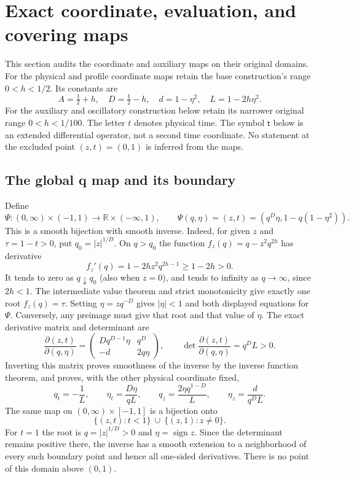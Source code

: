 \documentclass[10pt,a4paper]{article}
\begin{document}
\newtheorem{siproposition}{Proposition}[section]

\section{Exact coordinate, evaluation, and covering maps}
\label{si:maps-audit:coordinates}

This section audits the coordinate and auxiliary maps on their original
domains.  For the physical and profile coordinate maps retain the base
construction's range $0<h<1/2$.  Its constants are
\[
 A=\tfrac12+h,\quad D=\tfrac12-h,
 \quad d=1-\eta^2,\quad L=1-2h\eta^2.
\]
For the auxiliary and oscillatory construction below retain its narrower
original range $0<h<1/100$.
The letter $t$ denotes physical time.  The symbol $\mathsf t$ below is an
extended differential operator, not a second time coordinate.  No statement
at the excluded point $(z,t)=(0,1)$ is inferred from the maps.

\subsection{The global q map and its boundary}
Define
\[
 \Psi:(0,\infty)\times(-1,1)\longrightarrow
 \mathbb R\times(-\infty,1),\qquad
 \Psi(q,\eta)=(z,t)=(q^D\eta,1-q(1-\eta^2)).
\]
This is a smooth bijection with smooth inverse.  Indeed, for given $z$ and
$\tau=1-t>0$, put $q_0=|z|^{1/D}$.  On $q>q_0$ the function
$f_z(q)=q-z^2q^{2h}$ has derivative
\[
 f_z'(q)=1-2hz^2q^{2h-1}\ge1-2h>0.
\]
It tends to zero as $q\downarrow q_0$ (also when $z=0$), and tends to
infinity as $q\to\infty$, since $2h<1$.  The intermediate value theorem
and strict monotonicity give exactly one root $f_z(q)=\tau$.  Setting
$\eta=zq^{-D}$ gives $|\eta|<1$ and both displayed equations for $\Psi$.
Conversely, any preimage must give that root and that value of $\eta$.
The exact derivative matrix and determinant are
\[
 \frac{\partial(z,t)}{\partial(q,\eta)}
 =\begin{pmatrix}Dq^{D-1}\eta&q^D\\-d&2q\eta\end{pmatrix},
 \qquad \det\frac{\partial(z,t)}{\partial(q,\eta)}=q^DL>0.
\]
Inverting this matrix proves smoothness of the inverse by the inverse
function theorem, and proves, with the other physical coordinate fixed,
\[
 q_t=-\frac1L,\qquad \eta_t=\frac{D\eta}{qL},\qquad
 q_z=\frac{2\eta q^{1-D}}L,\qquad \eta_z=\frac{d}{q^DL}.
\]
The same map on $(0,\infty)\times[-1,1]$ is a bijection onto
\[
 \{(z,t):t<1\}\ \cup\ \{(z,1):z\ne0\}.
\]
For $t=1$ the root is $q=|z|^{1/D}>0$ and
$\eta=\operatorname{sign}z$.  Since the determinant remains positive
there, the inverse has a smooth extension to a neighborhood of every such
boundary point and hence all one-sided derivatives.  There is no point
of this domain above $(0,1)$.
\end{document}
